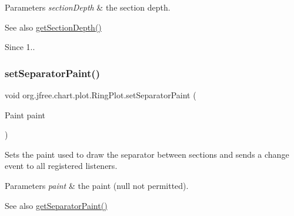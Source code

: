\begin{DoxyParams}{Parameters}
{\em section\+Depth} & the section depth.\\
\hline
\end{DoxyParams}
\begin{DoxySeeAlso}{See also}
\mbox{\hyperlink{classorg_1_1jfree_1_1chart_1_1plot_1_1_ring_plot_a5046fadad2c358a4759e81a3aa8b1830}{get\+Section\+Depth()}} 
\end{DoxySeeAlso}
\begin{DoxySince}{Since}
1.. 
\end{DoxySince}
\mbox{\label{classorg_1_1jfree_1_1chart_1_1plot_1_1_ring_plot_ab84ed901a672a1986208fac5eea4d124}} 
\subsubsection{\texorpdfstring{set\+Separator\+Paint()}{setSeparatorPaint()}}
{\footnotesize\ttfamily void org.\+jfree.\+chart.\+plot.\+Ring\+Plot.\+set\+Separator\+Paint (\begin{DoxyParamCaption}\item[{Paint}]{paint }\end{DoxyParamCaption})}

Sets the paint used to draw the separator between sections and sends a change event to all registered listeners.


\begin{DoxyParams}{Parameters}
{\em paint} & the paint ({\ttfamily null} not permitted).\\
\hline
\end{DoxyParams}
\begin{DoxySeeAlso}{See also}
\mbox{\hyperlink{classorg_1_1jfree_1_1chart_1_1plot_1_1_ring_plot_af26d61ff0ae77fc675f288a3a10102b1}{get\+Separator\+Paint()}} 
\end{DoxySeeAlso}
\mbox{\label{classorg_1_1jfree_1_1chart_1_1plot_1_1_ring_plot_a2a7c5abc0cbdd3919ed689af86617749}} 
